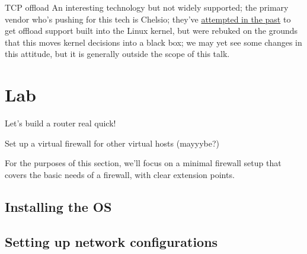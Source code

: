 \documentclass[bigger]{beamer}
\begin{document}
\begin{frame}[label={sec:orgc8262cc}]{TCP offload}
An interesting technology but not widely supported; the primary vendor who's
pushing for this tech is Chelsio; they've \href{https://lwn.net/Articles/148697/}{attempted in the past} to get offload
support built into the Linux kernel, but were rebuked on the grounds that this
moves kernel decisions into a black box; we may yet see some changes in this
attitude, but it is generally outside the scope of this talk.
\end{frame}

\section{Lab}
\label{sec:org475924a}

Let's build a router real quick!

Set up a virtual firewall for other virtual hosts (mayyybe?)

For the purposes of this section, we'll focus on a minimal firewall setup that
covers the basic needs of a firewall, with clear extension points.

\subsection{Installing the OS}
\label{sec:org4390e2a}

\subsection{Setting up network configurations}
\label{sec:orgc20c062}
\end{document}
